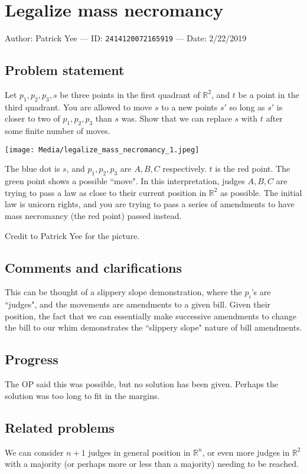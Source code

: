
\section{Legalize mass necromancy}

Author: Patrick Yee --- ID: \verb`2414120072165919` --- Date: 2/22/2019

\subsection{Problem statement}

Let $p_1,p_2,p_3,s$ be three points in the first quadrant of $\mathbb{R}^2$, and $t$ be a point in the third quadrant. You are allowed to move $s$ to a new points $s'$ so long as $s'$ is closer to two of $p_1,p_2,p_3$ than $s$ was. Show that we can replace $s$ with $t$ after some finite number of moves.

\texttt{[image: Media/legalize\_mass\_necromancy\_1.jpeg]}

The blue dot is $s$, and $p_1,p_2,p_3$ are $A,B,C$ respectively. $t$ is the red point. The green point shows a possible ``move". In this interpretation, judges $A,B,C$ are trying to pass a law as close to their current position in $\mathbb{R}^2$ as possible. The initial law is unicorn rights, and you are trying to pass a series of amendments to have mass necromancy (the red point) passed instead.

Credit to Patrick Yee for the picture.

\subsection{Comments and clarifications}

This can be thought of a slippery slope demonstration, where the $p_i$'s are ``judges", and the movements are amendments to a given bill. Given their position, the fact that we can essentially make successive amendments to change the bill to our whim demonstrates the ``slippery slope" nature of bill amendments.

\subsection{Progress}

The OP said this was possible, but no solution has been given. Perhaps the solution was too long to fit in the margins.

\subsection{Related problems}

We can consider $n+1$ judges in general position in $\mathbb{R}^n$, or even more judges in $\mathbb{R}^2$ with a majority (or perhaps more or less than a majority) needing to be reached.

